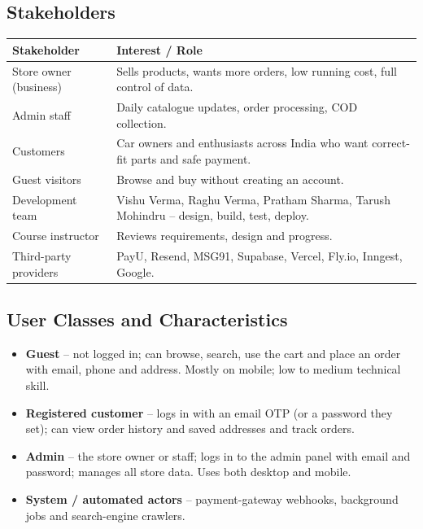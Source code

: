 \documentclass[11pt,a4paper]{article}
\begin{document}
\subsection{Stakeholders}
\begin{tabularx}{\linewidth}{@{}l X@{}}
\toprule
\textbf{Stakeholder} & \textbf{Interest / Role} \\
\midrule
Store owner (business) & Sells products, wants more orders, low running cost, full control of data. \\
Admin staff & Daily catalogue updates, order processing, COD collection. \\
Customers & Car owners and enthusiasts across India who want correct-fit parts and safe payment. \\
Guest visitors & Browse and buy without creating an account. \\
Development team & Vishu Verma, Raghu Verma, Pratham Sharma, Tarush Mohindru -- design, build, test, deploy. \\
Course instructor & Reviews requirements, design and progress. \\
Third-party providers & PayU, Resend, MSG91, Supabase, Vercel, Fly.io, Inngest, Google. \\
\bottomrule
\end{tabularx}

\subsection{User Classes and Characteristics}
\begin{itemize}
  \item \textbf{Guest} -- not logged in; can browse, search, use the cart and place an
        order with email, phone and address. Mostly on mobile; low to medium technical
        skill.
  \item \textbf{Registered customer} -- logs in with an email OTP (or a password they
        set); can view order history and saved addresses and track orders.
  \item \textbf{Admin} -- the store owner or staff; logs in to the admin panel with email
        and password; manages all store data. Uses both desktop and mobile.
  \item \textbf{System / automated actors} -- payment-gateway webhooks, background jobs
        and search-engine crawlers.
\end{itemize}
\end{document}
